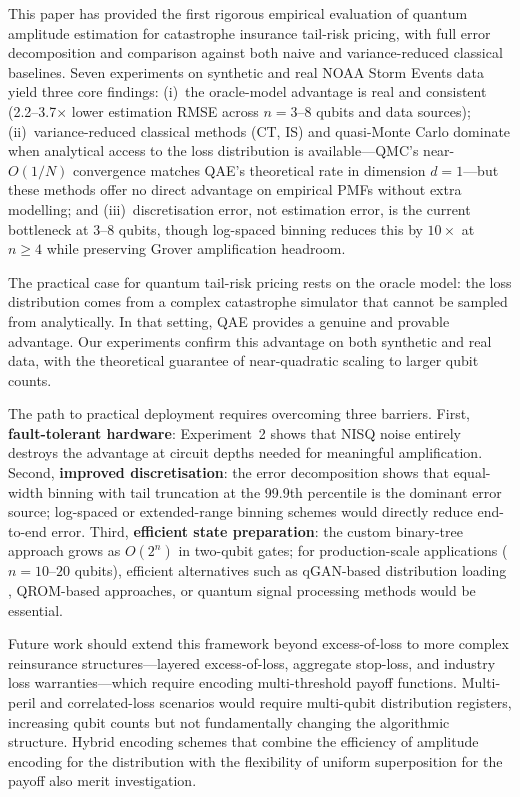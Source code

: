 \documentclass[11pt,a4paper]{article}
\begin{document}
This paper has provided the first rigorous empirical evaluation of quantum amplitude estimation for catastrophe insurance tail-risk pricing, with full error decomposition and comparison against both naive and variance-reduced classical baselines. Seven experiments on synthetic and real NOAA Storm Events data yield three core findings: (i)~the oracle-model advantage is real and consistent (2.2--3.7$\times$ lower estimation RMSE across $n=3$--$8$ qubits and data sources); (ii)~variance-reduced classical methods (CT, IS) and quasi-Monte Carlo dominate when analytical access to the loss distribution is available---QMC's near-$O(1/N)$ convergence matches QAE's theoretical rate in dimension $d=1$---but these methods offer no direct advantage on empirical PMFs without extra modelling; and (iii)~discretisation error, not estimation error, is the current bottleneck at 3--8 qubits, though log-spaced binning reduces this by $10\times$ at $n \geq 4$ while preserving Grover amplification headroom.

The practical case for quantum tail-risk pricing rests on the oracle model: the loss distribution comes from a complex catastrophe simulator that cannot be sampled from analytically. In that setting, QAE provides a genuine and provable advantage. Our experiments confirm this advantage on both synthetic and real data, with the theoretical guarantee of near-quadratic scaling to larger qubit counts.

The path to practical deployment requires overcoming three barriers. First, \textbf{fault-tolerant hardware}: Experiment~2 shows that NISQ noise entirely destroys the advantage at circuit depths needed for meaningful amplification. Second, \textbf{improved discretisation}: the error decomposition shows that equal-width binning with tail truncation at the 99.9th percentile is the dominant error source; log-spaced or extended-range binning schemes would directly reduce end-to-end error. Third, \textbf{efficient state preparation}: the custom binary-tree approach grows as $O(2^n)$ in two-qubit gates; for production-scale applications ($n = 10$--$20$ qubits), efficient alternatives such as qGAN-based distribution loading \cite{Zoufal2019}, QROM-based approaches, or quantum signal processing methods \cite{Stamatopoulos2024} would be essential.

Future work should extend this framework beyond excess-of-loss to more complex reinsurance structures---layered excess-of-loss, aggregate stop-loss, and industry loss warranties---which require encoding multi-threshold payoff functions. Multi-peril and correlated-loss scenarios would require multi-qubit distribution registers, increasing qubit counts but not fundamentally changing the algorithmic structure. Hybrid encoding schemes that combine the efficiency of amplitude encoding for the distribution with the flexibility of uniform superposition for the payoff also merit investigation.
\end{document}

